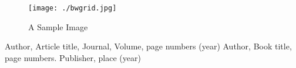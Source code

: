 \documentclass[twocolumn]{svjour3}          %
\begin{document}
\begin{figure}
	\begin{center}
			\texttt{[image: ./bwgrid.jpg]}
	\end{center}
	\caption{A Sample Image}
	\label{fig:1}
\end{figure}

\begin{thebibliography}{}
Author, Article title, Journal, Volume, page numbers (year)
Author, Book title, page numbers. Publisher, place (year)
\end{thebibliography}
\end{document}
